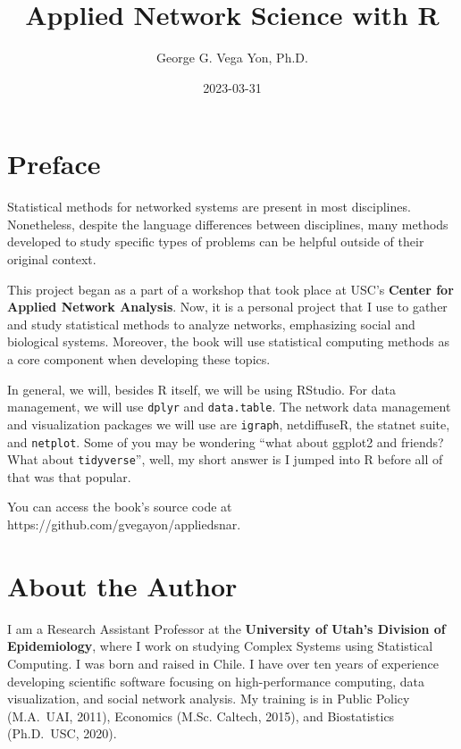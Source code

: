 \documentclass[
]{book}
\title{Applied Network Science with R}
\author{George G. Vega Yon, Ph.D.}
\date{2023-03-31}
\begin{document}
\maketitle

{
\setcounter{tocdepth}{1}
\tableofcontents
}
\hypertarget{preface}{%
\chapter{Preface}\label{preface}}

\renewcommand{\Pr}[1]{\mbox{Pr}\left(#1\right)}
\renewcommand{\exp}[1]{\mbox{exp}\left\{#1\right\}}

Statistical methods for networked systems are present in most disciplines. Nonetheless, despite the language differences between disciplines, many methods developed to study specific types of problems can be helpful outside of their original context.

This project began as a part of a workshop that took place at USC's \textbf{Center for Applied Network Analysis}. Now, it is a personal project that I use to gather and study statistical methods to analyze networks, emphasizing social and biological systems. Moreover, the book will use statistical computing methods as a core component when developing these topics.

In general, we will, besides R itself, we will be using RStudio. For data management, we will use \texttt{dplyr} and \texttt{data.table}. The network data management and visualization packages we will use are \texttt{igraph}, netdiffuseR, the statnet suite, and \texttt{netplot}. Some of you may be wondering ``what about ggplot2 and friends? What about \texttt{tidyverse}'', well, my short answer is I jumped into R before all of that was that popular.

You can access the book's source code at https://github.com/gvegayon/appliedsnar.

\hypertarget{about-the-author}{%
\chapter{About the Author}\label{about-the-author}}

I am a Research Assistant Professor at the \textbf{University of Utah's Division of Epidemiology}, where I work on studying Complex Systems using Statistical Computing. I was born and raised in Chile. I have over ten years of experience developing scientific software focusing on high-performance computing, data visualization, and social network analysis. My training is in Public Policy (M.A.~UAI, 2011), Economics (M.Sc. Caltech, 2015), and Biostatistics (Ph.D.~USC, 2020).
\end{document}
